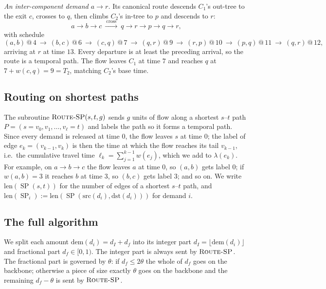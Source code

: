 \documentclass[11pt]{article}
\theoremstyle{definition}
\theoremstyle{remark}
\newcommand{\src}{\mathrm{src}}
\newcommand{\dst}{\mathrm{dst}}
\newcommand{\dem}{\mathrm{dem}}
\newcommand{\len}{\mathrm{len}}
\DeclareMathOperator{\SP}{SP}
\begin{document}
\emph{An inter-component demand $a\to r$.} Its canonical route descends $C_1$'s out-tree to the exit
$c$, crosses to $q$, then climbs $C_2$'s in-tree to $p$ and descends to $r$:
\[
  a\to b\to c\ \xrightarrow{\ \mathrm{cross}\ }\ q\to r\to p\to q\to r,
\]
with schedule
\[
  (a,b)\,@\,4\ \to\ (b,c)\,@\,6\ \to\ (c,q)\,@\,7\ \to\ (q,r)\,@\,9\ \to\ (r,p)\,@\,10\ \to\ (p,q)\,@\,11\ \to\ (q,r)\,@\,12,
\]
arriving at $r$ at time $13$. Every departure is at least the preceding arrival, so the route is a
temporal path. The flow leaves $C_1$ at time $7$ and reaches $q$ at $7+w(c,q)=9=T_2$, matching $C_2$'s
base time.

\subsection{Routing on shortest paths}\label{sec:sp}

The subroutine $\textsc{Route-SP}(s,t,g)$ sends $g$ units of flow along a shortest $s$--$t$ path
$P=(s=v_0,v_1,\dots,v_\ell=t)$ and labels the path so it forms a temporal path. Since every demand is
released at time $0$, the flow leaves $s$ at time $0$; the label of edge $e_k=(v_{k-1},v_k)$ is then
the time at which the flow reaches its tail $v_{k-1}$, i.e.\ the cumulative travel time
$\ell_k=\sum_{j=1}^{k-1}w(e_j)$, which we add to $\lambda(e_k)$. For example, on $a\to b\to c$ the flow
leaves $a$ at time $0$, so $(a,b)$ gets label $0$; if $w(a,b)=3$ it reaches $b$ at time $3$, so $(b,c)$
gets label $3$; and so on. We write $\len(\SP(s,t))$ for the number of edges of a shortest $s$--$t$
path, and $\len(\SP_i):=\len(\SP(\src(d_i),\dst(d_i)))$ for demand $i$.

\subsection{The full algorithm}\label{sec:full}

We split each amount $\dem(d_i)=d_I+d_f$ into its integer part $d_I=\lfloor\dem(d_i)\rfloor$ and
fractional part $d_f\in[0,1)$. The integer part is always sent by $\textsc{Route-SP}$. The fractional part is governed by $\theta$: if
$d_f\le2\theta$ the whole of $d_f$ goes on the backbone; otherwise a piece of size exactly $\theta$
goes on the backbone and the remaining $d_f-\theta$ is sent by $\textsc{Route-SP}$.
\end{document}

